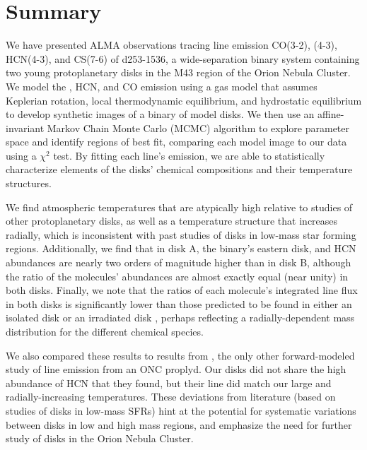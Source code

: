 \chapter{Summary}
\label{chap:Summary}


We have presented ALMA observations tracing line emission CO(3-2), \hco(4-3), HCN(4-3), and CS(7-6) of d253-1536, a wide-separation binary system containing two young protoplanetary disks in the M43 region of the Orion Nebula Cluster. We model the \hco, HCN, and CO emission using a gas model that assumes Keplerian rotation, local thermodynamic equilibrium, and hydrostatic equilibrium to develop synthetic images of a binary of model disks. We then use an affine-invariant Markov Chain Monte Carlo (MCMC) algorithm to explore parameter space and identify regions of best fit, comparing each model image to our data using a $\chi^2$ test. By fitting each line's emission, we are able to statistically characterize elements of the disks' chemical compositions and their temperature structures.

We find atmospheric temperatures that are atypically high relative to studies of other protoplanetary disks, as well as a temperature structure that increases radially, which is inconsistent with past studies of disks in low-mass star forming regions. Additionally, we find that in disk A, the binary's eastern disk, \hco{} and HCN abundances are nearly two orders of magnitude higher than in disk B, although the ratio of the molecules' abundances are almost exactly equal (near unity) in both disks. Finally, we note that the ratios of each molecule's integrated line flux in both disks is significantly lower than those predicted to be found in either an isolated disk or an irradiated disk \citep{Walsh2013}, perhaps reflecting a radially-dependent mass distribution for the different chemical species.

We also compared these results to results from \citet{Factor2017}, the only other forward-modeled study of line emission from an ONC proplyd. Our disks did not share the high abundance of HCN that they found, but their \hco{} line did match our large and radially-increasing temperatures. These deviations from literature (based on studies of disks in low-mass SFRs) hint at the potential for systematic variations between disks in low and high mass regions, and emphasize the need for further study of disks in the Orion Nebula Cluster.


